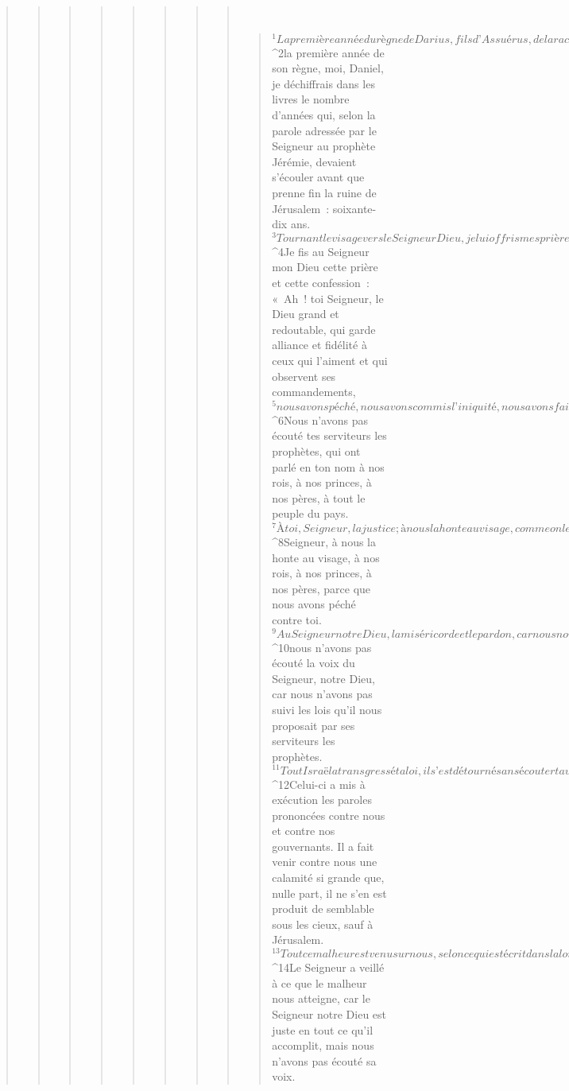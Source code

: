 \begin{verse}
\begin{verse}
\begin{verse}
\begin{verse}
\begin{verse}
\begin{verse}
\begin{verse}
\begin{verse}
         
      \bchapter{}
      \begin{verse}
${}^{1}La première année du règne de Darius, fils d’Assuérus, de la race des Mèdes, qui était devenu roi des Chaldéens, 
${}^{2}la première année de son règne, moi, Daniel, je déchiffrais dans les livres le nombre d’années qui, selon la parole adressée par le Seigneur au prophète Jérémie, devaient s’écouler avant que prenne fin la ruine de Jérusalem : soixante-dix ans. 
${}^{3}Tournant le visage vers le Seigneur Dieu, je lui offris mes prières et mes supplications dans le jeûne, le sac et la cendre. 
${}^{4}Je fis au Seigneur mon Dieu cette prière et cette confession :
      « Ah ! toi Seigneur, le Dieu grand et redoutable, qui garde alliance et fidélité à ceux qui l’aiment et qui observent ses commandements, 
${}^{5}nous avons péché, nous avons commis l’iniquité, nous avons fait le mal, nous avons été rebelles, nous nous sommes détournés de tes commandements et de tes ordonnances. 
${}^{6}Nous n’avons pas écouté tes serviteurs les prophètes, qui ont parlé en ton nom à nos rois, à nos princes, à nos pères, à tout le peuple du pays. 
${}^{7}À toi, Seigneur, la justice ; à nous la honte au visage, comme on le voit aujourd’hui pour les gens de Juda, pour les habitants de Jérusalem et de tout Israël, pour ceux qui sont près et pour ceux qui sont loin, dans tous les pays où tu les as chassés, à cause des infidélités qu’ils ont commises envers toi. 
${}^{8}Seigneur, à nous la honte au visage, à nos rois, à nos princes, à nos pères, parce que nous avons péché contre toi. 
${}^{9}Au Seigneur notre Dieu, la miséricorde et le pardon, car nous nous sommes révoltés contre lui, 
${}^{10}nous n’avons pas écouté la voix du Seigneur, notre Dieu, car nous n’avons pas suivi les lois qu’il nous proposait par ses serviteurs les prophètes. 
${}^{11}Tout Israël a transgressé ta loi, il s’est détourné sans écouter ta voix. Alors, les malédictions et les menaces inscrites dans la loi de Moïse, le serviteur de Dieu, se sont répandues sur nous, parce que nous avons péché contre le Seigneur. 
${}^{12}Celui-ci a mis à exécution les paroles prononcées contre nous et contre nos gouvernants. Il a fait venir contre nous une calamité si grande que, nulle part, il ne s’en est produit de semblable sous les cieux, sauf à Jérusalem. 
${}^{13}Tout ce malheur est venu sur nous, selon ce qui est écrit dans la loi de Moïse. Mais nous n’avons pas apaisé la face du Seigneur notre Dieu, puisque nous ne sommes pas revenus de nos fautes en prêtant attention à la vérité. 
${}^{14}Le Seigneur a veillé à ce que le malheur nous atteigne, car le Seigneur notre Dieu est juste en tout ce qu’il accomplit, mais nous n’avons pas écouté sa voix. 

\end{verse}
\end{verse}
\end{verse}
\end{verse}
\end{verse}
\end{verse}
\end{verse}
\end{verse}
\end{verse}
